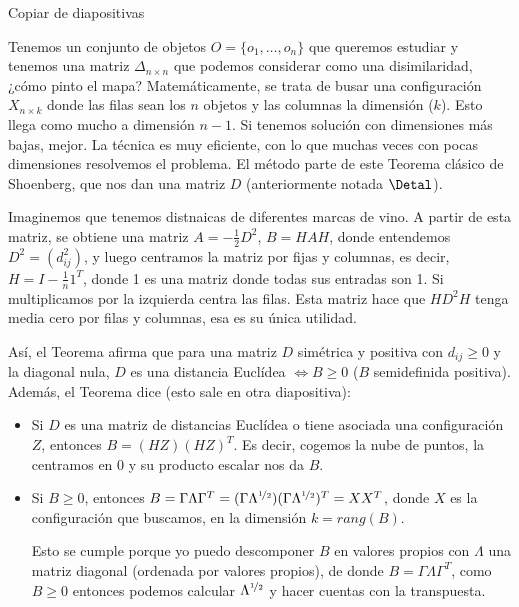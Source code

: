 
\begin{teo}[Schoenberg]
    Copiar de diapositivas
\end{teo}

\noindent
Tenemos un conjunto de objetos $O=\{o_1,\ldots,o_n\}$ que queremos estudiar y tenemos una matriz $\Delta_{n\times n}$ que podemos considerar como una disimilaridad, ¿cómo pinto el mapa? Matemáticamente, se trata de busar una configuración $X_{n\times k}$ donde las filas sean los $n$ objetos y las columnas la dimensión ($k$). Esto llega como mucho a dimensión $n-1$. Si tenemos solución con dimensiones más bajas, mejor. La técnica es muy eficiente, con lo que muchas veces con pocas dimensiones resolvemos el problema. El método parte de este Teorema clásico de Shoenberg, que nos dan una matriz $D$ (anteriormente notada $\Detal$).

Imaginemos que tenemos distnaicas de diferentes marcas de vino. A partir de esta matriz, se obtiene una matriz $A=-\frac{1}{2}D^2$, $B=HAH$, donde entendemos $D^2 = (d_{ij}^2)$, y luego centramos la matriz por fijas y columnas, es decir, $H = I-\frac{1}{n}1^T$, donde 1 es una matriz donde todas sus entradas son 1. Si multiplicamos por la izquierda centra las filas. Esta matriz hace que $HD^2H$ tenga media cero por filas y columnas, esa es su única utilidad.

Así, el Teorema afirma que para una matriz $D$ simétrica y positiva con $d_{ij}\geq 0$ y la diagonal nula, $D$ es una distancia Euclídea $\Longleftrightarrow B\geq 0$ ($B$ semidefinida positiva). Además, el Teorema dice (esto sale en otra diapositiva):

\begin{itemize}
    \item Si $D$ es una matriz de distancias Euclídea o tiene asociada una configuración $Z$, entonces $B = (HZ)(HZ)^T$. Es decir, cogemos la nube de puntos, la centramos en $0$ y su producto escalar nos da $B$.
    \item Si $B\geq 0$, entonces $B=\Gamma \Lambda \Gamma^T = (\Gamma \Lambda^{\nicefrac{1}{2}})(\Gamma \Lambda^{\nicefrac{1}{2}})^T = XX^T$, donde $X$ es la configuración que buscamos, en la dimensión $k=rang(B)$.

        Esto se cumple porque yo puedo descomponer $B$ en valores propios con $\Lambda$ una matriz diagonal (ordenada por valores propios), de donde $B = \Gamma\Lambda\Gamma^T$, como $B\geq 0$ entonces podemos calcular $\Lambda^{\nicefrac{1}{2}}$ y hacer cuentas con la transpuesta.
\end{itemize}

